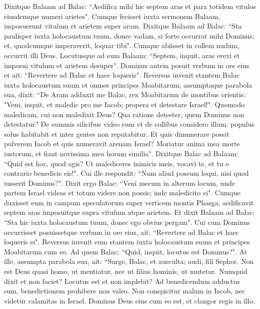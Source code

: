 \begin{biblechapter}  
\verse Dixitque Balaam ad Balac: “Aedifica mihi hic septem aras et para totidem vitulos eiusdemque numeri arietes". 
\verse Cumque fecisset iuxta sermonem Balaam, imposuerunt vitulum et arietem super aram. 
\verse Dixitque Balaam ad Balac: “Sta paulisper iuxta holocaustum tuum, donec vadam, si forte occurrat mihi Dominus; et, quodcumque imperaverit, loquar tibi". Cumque abiisset in collem nudum, 
\verse occurrit illi Deus. Locutusque ad eum Balaam: “Septem, inquit, aras erexi et imposui vitulum et arietem desuper". 
\verse Dominus autem posuit verbum in ore eius et ait: “Revertere ad Balac et haec loqueris". 
\verse Reversus invenit stantem Balac iuxta holocaustum suum et omnes principes Moabitarum; 
\verse assumptaque parabola sua, dixit: “De Aram adduxit me Balac, rex Moabitarum de montibus orientis: "Veni, inquit, et maledic pro me Iacob; propera et detestare Israel!". 
\verse Quomodo maledicam, cui non maledixit Deus? Qua ratione detester, quem Dominus non detestatur? 
\verse De summis silicibus video eum et de collibus considero illum: populus solus habitabit et inter gentes non reputabitur. 
\verse Et quis dinumerare possit pulverem Iacob et quis numeravit arenam Israel? Moriatur anima mea morte iustorum, et fiant novissima mea horum similia". 
\verse Dixitque Balac ad Balaam: “Quid est hoc, quod agis? Ut malediceres inimicis meis, vocavi te, et tu e contrario benedicis eis!". 
\verse Cui ille respondit: “Num aliud possum loqui, nisi quod iusserit Dominus?". 
\verse Dixit ergo Balac: “Veni mecum in alterum locum, unde partem Israel videas et totum videre non possis; inde maledicito ei". 
\verse Cumque duxisset eum in campum speculatorum super verticem montis Phasga, aedificavit septem aras imposuitque supra vitulum atque arietem. 
\verse Et dixit Balaam ad Balac: “Sta hic iuxta holocaustum tuum, donec ego obvius pergam". 
\verse Cui cum Dominus occurrisset posuissetque verbum in ore eius, ait: “Revertere ad Balac et haec loqueris ei". 
\verse Reversus invenit eum stantem iuxta holocaustum suum et principes Moabitarum cum eo. Ad quem Balac: “Quid, inquit, locutus est Dominus?". 
\verse At ille, assumpta parabola sua, ait: “Surge, Balac, et ausculta; audi, fili Sephor. 
\verse Non est Deus quasi homo, ut mentiatur, nec ut filius hominis, ut mutetur. Numquid dixit et non faciet? Locutus est et non implebit? 
\verse Ad benedicendum adductus sum, benedictionem prohibere non valeo. 
\verse Non conspicitur malum in Iacob, nec videtur calamitas in Israel. Dominus Deus eius cum eo est, et clangor regis in illo. 

\end{biblechapter}
